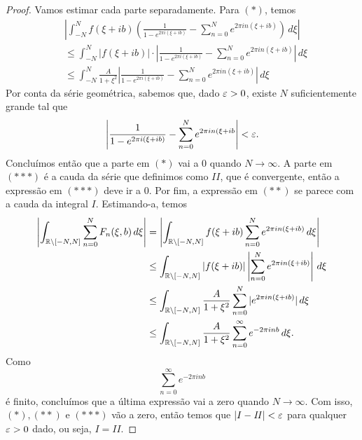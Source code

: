 \begin{proof}
        Vamos estimar cada parte separadamente. Para $(*)$, temos
        \begin{align*}
            &\left|\int_{-N}^{N} f(\xi + ib)\left(\frac{1}{1 - e^{2\pi i(\xi + ib)}} - \sum_{n=0}^{N}e^{2\pi i n(\xi + ib)}\right) \, d\xi \right| \\
            &\leq \int_{-N}^{N} |f(\xi + ib)|\cdot\left|\frac{1}{1 - e^{2\pi i(\xi + ib)}} - \sum_{n=0}^{N}e^{2\pi i n(\xi + ib)}\right| \, d\xi \\
            &\leq \int_{-N}^{N} \frac{A}{1 + \xi^2}\left|\frac{1}{1 - e^{2\pi i(\xi + ib)}} - \sum_{n=0}^{N}e^{2\pi i n(\xi + ib)}\right| \, d\xi 
        \end{align*}
        Por conta da série geométrica, sabemos que, dado $\varepsilon>0$, existe 
        $N$ suficientemente grande tal que
        \begin{equation*}
            \left|\frac{1}{1 - e^{2\pi i(\xi + ib)}} - 
            \sum_{n=0}^{N}e^{2\pi i n(\xi + ib}\right| < \varepsilon. 
        \end{equation*}
        Concluímos então que a parte em $(*)$ vai a $0$ quando $N \to \infty$. 
        A parte em $(***)$ é a cauda da série que definimos como $\mathit{II}$, 
        que é convergente, então a expressão em $(***)$ deve ir a $0$. 
        Por fim, a expressão em $(**)$ se parece com a cauda da integral $I$.
        Estimando-a, temos
        \begin{align*}
            \left|\int_{\mathbb{R} \setminus [-N,N]}\sum_{n=0}^{N}F_n(\xi,b) \, d\xi\right| 
            &= \left|\int_{\mathbb{R} \setminus [-N,N]}f(\xi + ib)\sum_{n=0}^{N}
            e^{2\pi i n(\xi + ib)} \, d\xi\right| \\
            &\leq \int_{\mathbb{R} \setminus [-N,N]}|f(\xi + ib)|\left|\sum_{n=0}^{N}
            e^{2\pi i n(\xi + ib)} \right|\, d\xi \\
            &\leq \int_{\mathbb{R} \setminus [-N,N]}\frac{A}{1 + \xi^2} 
            \sum_{n=0}^{N}|e^{2\pi i n(\xi + ib)}| \, d\xi \\
            &\leq \int_{\mathbb{R} \setminus [-N,N]}\frac{A}{1 + \xi^2}
            \sum_{n=0}^{\infty}e^{-2\pi i nb} \, d\xi. 
        \end{align*}
        Como 
        \begin{equation*}
            \sum_{n=0}^{\infty} e^{-2\pi i nb}
        \end{equation*}
        é finito, concluímos que 
        a última expressão vai a zero quando $N \to \infty$. Com isso, 
        $(*), (**)$ e $(***)$ vão a zero, então temos que $|I - \mathit{II}|< \varepsilon$ para 
        qualquer $\varepsilon>0$ dado, ou seja, $I = \mathit{II}$.
        \end{proof}
